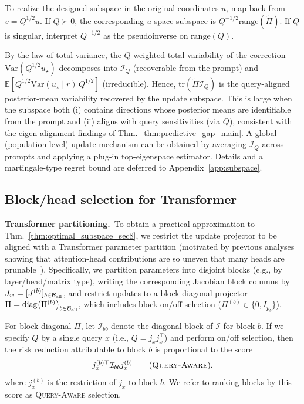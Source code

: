 \documentclass{article}
\theoremstyle{plain}
\theoremstyle{definition}
\theoremstyle{remark}
\begin{document}
To realize the designed subspace in the original coordinates $u$, map back from $v=Q^{1/2}u$. If $Q\succ 0$, the corresponding $u$-space subspace is $Q^{-1/2}\mathrm{range}(\widetilde\Pi)$. If $Q$ is singular, interpret $Q^{-1/2}$ as the pseudoinverse on $\mathrm{range}(Q)$.


By the law of total variance, the $Q$-weighted total variability of the correction $\mathrm{Var}(Q^{1/2}u_\star)$ decomposes into $\mathcal I_Q$ (recoverable from the prompt) and $\mathbb{E}\!\left[Q^{1/2}\mathrm{Var}(u_\star\mid r)\,Q^{1/2}\right]$ (irreducible).
Hence, $\mathrm{tr}(\widetilde\Pi\mathcal I_Q)$ is the query-aligned posterior-mean variability recovered by the update subspace. This is large when the subspace both (i) contains directions whose posterior means are identifiable from the prompt and (ii) aligns with query sensitivities (via $Q$), consistent with the eigen-alignment findings of Thm.~\ref{thm:predictive_gap_main}. A global (population-level) update mechanism can be obtained by averaging $\mathcal I_Q$ across prompts and applying a plug-in top-eigenspace estimator. Details and a martingale-type regret bound are deferred to Appendix~\ref{app:subspace}.


\subsection{Block/head selection for Transformer}\label{subsec:sec8_transformer_subspace}

\textbf{Transformer partitioning.}\,
To obtain a practical approximation to Thm.~\ref{thm:optimal_subspace_sec8}, we restrict the update projector to be aligned with a Transformer parameter partition (motivated by previous analyses showing that attention-head contributions are so uneven that many heads are prunable~\citep{NEURIPS2019_2c601ad9,voita-etal-2019-analyzing}). 
Specifically, we partition parameters into disjoint blocks (e.g., by layer/head/matrix type), writing the corresponding Jacobian block columns by $J_w=[J^{(b)}]_{b\in\mathcal{B}_{\rm all}}$, and restrict updates to a block-diagonal projector $\Pi=\mathrm{diag}\bigl(\Pi^{(b)}\bigr)_{b\in\mathcal{B}_{\rm all}}$, which includes block on/off selection ($\Pi^{(b)}\in\{0,I_{p_b}\}$).

For block-diagonal $\Pi$, let $\mathcal{I}_{bb}$ denote the diagonal block of $\mathcal I$ for block $b$. If we specify $Q$ by a single query $x$ (i.e., $Q=j_x j_x^\top$) and perform on/off selection, then the risk reduction attributable to block $b$ is proportional to the score
\begin{equation}
    j_x^{(b)\top}\mathcal I_{bb}j_x^{(b)}  \qquad  (\textsc{Query-Aware}), 
\end{equation}
where $j_x^{(b)}$ is the restriction of $j_x$ to block $b$. We refer to ranking blocks by this score as \textsc{Query-Aware} selection.
\end{document}
